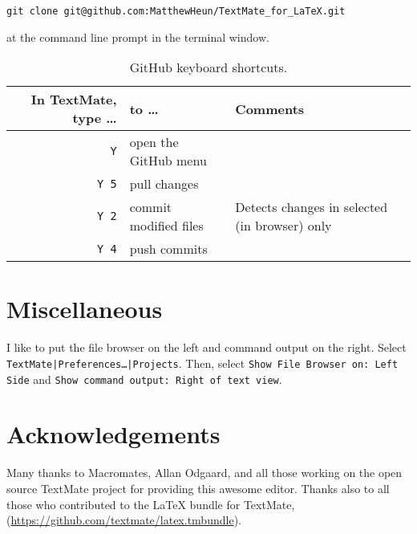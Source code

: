 \documentclass[10pt]{article}
\begin{document}
\verb!git clone git@github.com:MatthewHeun/TextMate_for_LaTeX.git!

\noindent at the command line prompt in the terminal window.

\begin{table}
\centering
\caption{GitHub keyboard shortcuts.}
\begin{tabular}{r|l|l}
	In TextMate, type \dots & to \dots      & Comments                                       \\
	\hline
	\cmdkey\texttt{Y}           & open the GitHub menu            &                          \\
	\cmdkey\texttt{Y 5}         & pull changes                    &                          \\
	\cmdkey\texttt{Y 2}         & commit modified files           & Detects changes in selected (in browser) only \\
	\cmdkey\texttt{Y 4}         & push commits                    &                          \\
\end{tabular}
\label{tab:github_keyboard_shortcuts}
\end{table}



\section{Miscellaneous} %
\label{sec:miscellaneous}
I like to put the file browser on the left and command output on the right.
Select \texttt{TextMate|Preferences\dots|Projects}.
Then, select \texttt{Show File Browser on: Left Side} and
\texttt{Show command output: Right of text view}.



\section*{Acknowledgements} %
\label{sec:acknowledgements}

Many thanks to Macromates, Allan Odgaard, and all those working 
on the open source TextMate project for providing this awesome editor.
Thanks also to all those who contributed to the \LaTeX{} bundle for TextMate,
(\url{https://github.com/textmate/latex.tmbundle}).

\end{document}
